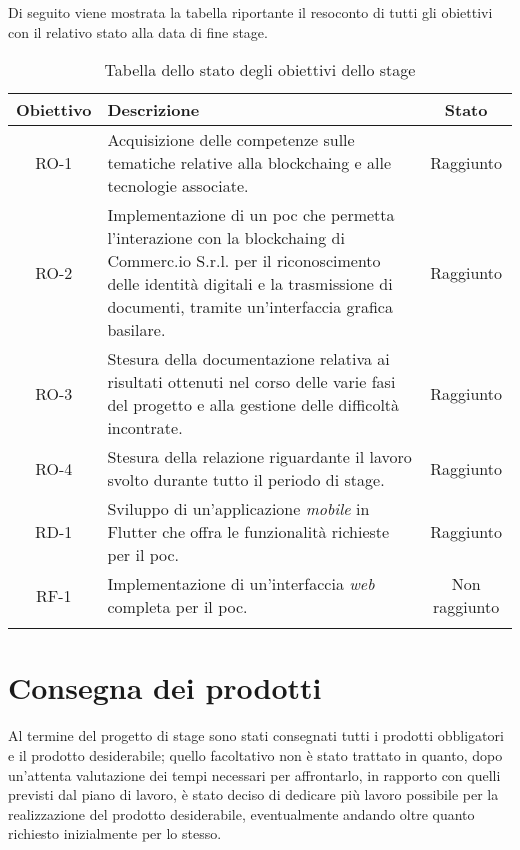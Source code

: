 Di seguito viene mostrata la tabella riportante il resoconto di tutti gli obiettivi con il relativo stato alla data di fine stage.

\begin{longtable}{|c|p{7.8cm}|c|}
	\hline
	\rowcolor{gray}
	\textbf{Obiettivo} & \textbf{Descrizione} & \textbf{Stato} \\\hline
	RO-1 & Acquisizione delle competenze sulle tematiche relative alla \gls{blockchaing} e alle tecnologie associate. & Raggiunto \\\hline
	RO-2 & Implementazione di un \gls{poc} che permetta l'interazione con la \gls{blockchaing} di Commerc.io S.r.l. per il riconoscimento delle identità digitali e la trasmissione di documenti, tramite un'interfaccia grafica basilare. & Raggiunto \\\hline
	RO-3 & Stesura della documentazione relativa ai risultati ottenuti nel corso delle varie fasi del progetto e alla gestione delle difficoltà incontrate. & Raggiunto \\\hline
	RO-4 & Stesura della relazione riguardante il lavoro svolto durante tutto il periodo di stage. & Raggiunto \\\hline
	RD-1 & Sviluppo di un'applicazione \textit{mobile} in Flutter che offra le funzionalità richieste per il \gls{poc}. & Raggiunto \\\hline
	RF-1 & Implementazione di un'interfaccia \textit{web} completa per il \gls{poc}. & Non raggiunto \\\hline
	
	\caption{Tabella dello stato degli obiettivi dello stage}
	\label{tab:raggiungimento-obiettivi}
\end{longtable}

\section{Consegna dei prodotti}

Al termine del progetto di stage sono stati consegnati tutti i prodotti obbligatori e il prodotto desiderabile; quello facoltativo non è stato trattato in quanto, dopo un'attenta valutazione dei tempi necessari per affrontarlo, in rapporto con quelli previsti dal piano di lavoro, è stato deciso di dedicare più lavoro possibile per la realizzazione del prodotto desiderabile, eventualmente andando oltre quanto richiesto inizialmente per lo stesso.

